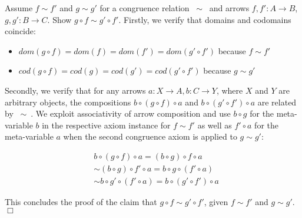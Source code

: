 
Assume $f \sim f'$ and $g \sim g'$ for a congruence relation $\ \sim\ $ and arrows $f, f' : A → B$, $g, g' : B → C$. Show $g ∘ f \sim g' ∘ f'$. Firstly, we verify that domains and codomains coincide:

\begin{itemize}
	\item $dom(g ∘ f) = dom(f) = dom(f') = dom(g' ∘ f')$ because $f \sim f'$
	\item $cod(g ∘ f) = cod(g) = cod(g') = cod(g' ∘ f')$ because $g \sim g'$
\end{itemize}

Secondly, we verify that for any arrows $a : X → A, b : C → Y$, where $X$ and $Y$ are arbitrary objects, the compositions $b ∘ (g ∘ f) ∘ a$ and $b ∘ (g' ∘ f') ∘ a$ are related by $\ \sim\ $. We exploit associativity of arrow composition and use $b ∘ g$ for the meta-variable $b$ in the respective axiom instance for $f \sim f'$ as well as $f' ∘ a$ for the meta-variable $a$ when the second congruence axiom is applied to $g \sim g'$:

\begin{align*}
	& b ∘ (g ∘ f) ∘ a = (b ∘ g) ∘ f ∘ a \\
	& \sim (b ∘ g) ∘ f' ∘ a = b ∘ g ∘ (f' ∘ a) \\
	& \sim b ∘ g' ∘ (f' ∘ a) = b ∘ (g' ∘ f') ∘ a
\end{align*}

This concludes the proof of the claim that $g ∘ f \sim g' ∘ f'$, given $f \sim f'$ and $g \sim g'$. \hfill $\Box$
